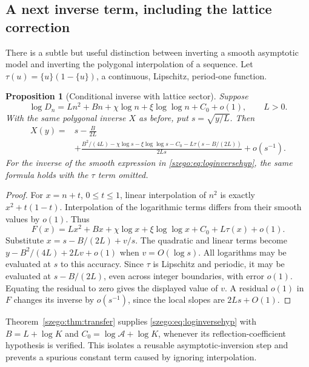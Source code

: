 \documentclass[11pt,a4paper]{article}
\numberwithin{equation}{section}
\newtheorem{proposition}[theorem]{Proposition}
\theoremstyle{remark}\newtheorem{remark}[theorem]{Remark}
\begin{document}
\subsection{A next inverse term, including the lattice correction}
There is a subtle but useful distinction between inverting a smooth
asymptotic model and inverting the polygonal interpolation of a sequence.
Let $\tau(u)=\{u\}(1-\{u\})$, a continuous, Lipschitz, period-one function.

\begin{proposition}[Conditional inverse with lattice sector]\label{szego:prop:lattice}
Suppose
\begin{equation}\label{szego:eq:loginversehyp}
 \log D_n=Ln^2+Bn+\chi\log n+\xi\log\log n+C_0+o(1),
 \qquad L>0.
\end{equation}
With the same polygonal inverse $X$ as before, put $s=\sqrt{y/L}$.
Then
\begin{equation}\label{szego:eq:latticeinverse}
 \begin{split}
 X(y)={}&s-\frac B{2L}\\
 &+\frac{B^2/(4L)-\chi\log s-\xi\log\log s-C_0
           -L\tau(s-B/(2L))}{2Ls}
 +o(s^{-1}).
 \end{split}
\end{equation}
For the inverse of the smooth expression in \eqref{szego:eq:loginversehyp},
the same formula holds with the $\tau$ term omitted.
\end{proposition}
\begin{proof}
For $x=n+t$, $0\leq t\leq1$, linear interpolation of $n^2$ is exactly
$x^2+t(1-t)$. Interpolation of the logarithmic terms differs from their
smooth values by $o(1)$. Thus
\[
 F(x)=Lx^2+Bx+\chi\log x+\xi\log\log x+C_0+L\tau(x)+o(1).
\]
Substitute $x=s-B/(2L)+v/s$.
The quadratic and linear terms become
$y-B^2/(4L)+2Lv+o(1)$ when $v=O(\log s)$.
All logarithms may be evaluated at $s$ to this accuracy.
Since $\tau$ is Lipschitz and periodic, it may be evaluated at
$s-B/(2L)$, even across integer boundaries, with error $o(1)$.
Equating the residual to zero gives the displayed value of $v$.
A residual $o(1)$ in $F$ changes its inverse by $o(s^{-1})$, since the
local slopes are $2Ls+O(1)$.
\end{proof}

Theorem~\ref{szego:thm:transfer} supplies \eqref{szego:eq:loginversehyp} with
$B=L+\log K$ and $C_0=\log\mathcal A+\log K$, whenever its
reflection-coefficient hypothesis is verified.
This isolates a reusable asymptotic-inversion step and prevents a
spurious constant term caused by ignoring interpolation.
\end{document}
